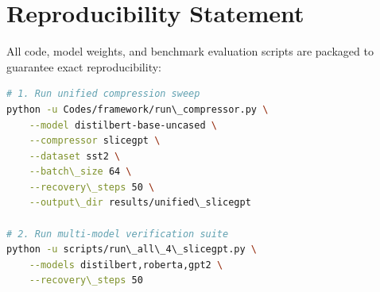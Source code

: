 \section{Reproducibility Statement}
All code, model weights, and benchmark evaluation scripts are packaged to guarantee exact reproducibility:
\begin{lstlisting}[language=bash]
# 1. Run unified compression sweep
python -u Codes/framework/run\_compressor.py \
    --model distilbert-base-uncased \
    --compressor slicegpt \
    --dataset sst2 \
    --batch\_size 64 \
    --recovery\_steps 50 \
    --output\_dir results/unified\_slicegpt

# 2. Run multi-model verification suite
python -u scripts/run\_all\_4\_slicegpt.py \
    --models distilbert,roberta,gpt2 \
    --recovery\_steps 50
\end{lstlisting}

